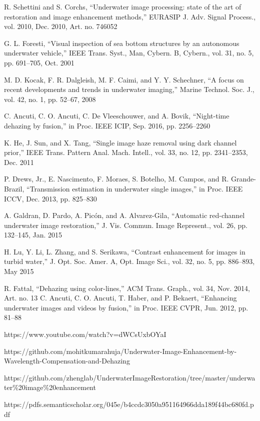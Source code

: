 \documentclass[hidelinks, 12pt]{report}
\begin{document}
\begin{thebibliography}{1}
\bibitem{} R. Schettini and S. Corchs, “Underwater image processing: state of the art of restoration and image enhancement methods,” EURASIP J. Adv. Signal Process., vol. 2010, Dec. 2010, Art. no. 746052 

\bibitem{} G. L. Foresti, “Visual inspection of sea bottom structures by an autonomous underwater vehicle,” IEEE Trans. Syst., Man, Cybern. B, Cybern., vol. 31, no. 5, pp. 691–705, Oct. 2001

\bibitem{} M. D. Kocak, F. R. Dalgleish, M. F. Caimi, and Y. Y. Schechner, “A focus on recent developments and trends in underwater imaging,” Marine Technol. Soc. J., vol. 42, no. 1, pp. 52–67, 2008

\bibitem{} C. Ancuti, C. O. Ancuti, C. De Vleeschouwer, and A. Bovik, “Night-time dehazing by fusion,” in Proc. IEEE ICIP, Sep. 2016, pp. 2256–2260

\bibitem{} K. He, J. Sun, and X. Tang, “Single image haze removal using dark channel prior,” IEEE Trans. Pattern Anal. Mach. Intell., vol. 33, no. 12, pp. 2341–2353, Dec. 2011

\bibitem{} P. Drews, Jr., E. Nascimento, F. Moraes, S. Botelho, M. Campos, and R. Grande-Brazil, “Transmission estimation in underwater single images,” in Proc. IEEE ICCV, Dec. 2013, pp. 825–830

\bibitem{} A. Galdran, D. Pardo, A. Picón, and A. Alvarez-Gila, “Automatic red-channel underwater image restoration,” J. Vis. Commun. Image Represent., vol. 26, pp. 132–145, Jan. 2015

\bibitem{} H. Lu, Y. Li, L. Zhang, and S. Serikawa, “Contrast enhancement for images in turbid water,” J. Opt. Soc. Amer. A, Opt. Image Sci., vol. 32, no. 5, pp. 886–893, May 2015

\bibitem{} R. Fattal, “Dehazing using color-lines,” ACM Trans. Graph., vol. 34, Nov. 2014, Art. no. 13
\bibitem{} C. Ancuti, C. O. Ancuti, T. Haber, and P. Bekaert, “Enhancing underwater images and videos by fusion,” in Proc. IEEE CVPR, Jun. 2012,
pp. 81–88

\bibitem{} {https://www.youtube.com/watch?v=dWCsUxbOYaI}

\bibitem{} {https://github.com/mohitkumarahuja/Underwater-Image-Enhancement-by-Wavelength-Compensation-and-Dehazing}

\bibitem{} {https://github.com/zhenglab/UnderwaterImageRestoration/tree/master/underwater\%20image\%20enhancement}

\bibitem{} {https://pdfs.semanticscholar.org/045e/b4ccdc3050a951164966dda189f44bc680fd.pdf}
\end{thebibliography}
\end{document}
